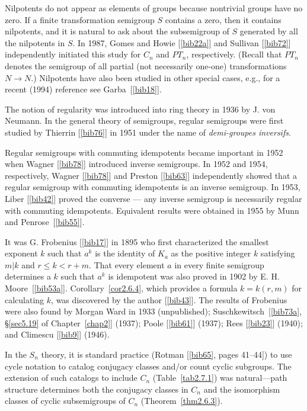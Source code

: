 \documentclass{surv-l}
\numberwithin{equation}{section}
\numberwithin{table}{section}
\numberwithin{figure}{section}
\theoremstyle{plain}
\theoremstyle{definition}
\begin{document}
Nilpotents do not appear as elements of groups because nontrivial
groups have no zero. If a finite transformation semigroup $S$
contains a zero, then it contains nilpotents, and it is natural to
ask about the subsemigroup of $S$ generated by all the nilpotents
in $S$. In 1987, Gomes and Howie [\ref{bib22a}] and
Sullivan [\ref{bib72}]
independently initiated this study for $C_{n}$ and $PT_{n}$,
respectively. (Recall that $PT_{n}$ denotes the semigroup of all
partial (not necessarily one-one) transformations $N\rightarrow
N$.) Nilpotents have also been studied in other special cases,
e.g., for a recent (1994) reference see Garba~[\ref{bib18}].

The notion of regularity was introduced into ring theory in 1936
by J. von Neumann. In the general theory of
semigroups, regular semigroups were first studied by
Thierrin [\ref{bib76}] in
1951 under the name of \emph{demi-groupes inversifs}.

Regular semigroups with commuting idempotents became important in
1952 when Wagner [\ref{bib78}] introduced
inverse semigroups. In 1952 and 1954, respectively, Wagner
[\ref{bib78}] and Preston
[\ref{bib63}] independently showed that a
regular semigroup with commuting idempotents is an inverse
semigroup. In 1953, Liber
[\ref{bib42}] proved the converse
--- any inverse semigroup is necessarily regular with commuting
idempotents. Equivalent results were obtained in 1955 by Munn and
Penrose~[\ref{bib55}].

It was G. Frobenius
[\ref{bib17}] in 1895 who first characterized
the smallest exponent $k$ such that $a^{k}$ is the identity of
$K_{a}$ as the positive integer $k$ satisfying $m|k$ and $r\leq
k<r+m$. That every element $a$ in every finite semigroup determines
a $k$ such that $a^{k}$ is idempotent was also proved in 1902 by
E. H. Moore~[\ref{bib53a}].
Corollary~\ref{cor2.6.4}, which provides a formula $k=k(r,m)$ for
calculating $k$, was discovered by the author
[\ref{bib43}]. The results of Frobenius were
also found by Morgan Ward in 1933 (unpublished);
Suschkewitsch~[\ref{bib73a}, \S\ref{sec5.19} of
Chapter~\ref{chap2}] (1937); Poole
[\ref{bib61}] (1937); Rees
[\ref{bib23}] (1940); and
Climescu [\ref{bib9}]
(1946).

In the $S_{n}$ theory, it is standard practice
(Rotman [\ref{bib65}, pages
41--44]) to use cycle notation to catalog conjugacy classes
and/or count cyclic subgroups. The extension of such catalogs to
include $C_{n}$ (Table~\ref{tab2.7.1}) was natural---path
structure determines both the conjugacy classes in $C_{n}$ and the
isomorphism classes of cyclic subsemigroups of $C_{n}$
(Theorem~\ref{thm2.6.3}).
\end{document}
